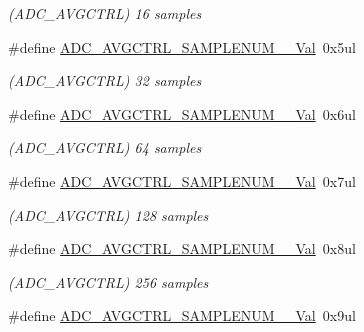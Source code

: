 \begin{DoxyCompactItemize}
\begin{DoxyCompactList}\small\item\em (A\+D\+C\+\_\+\+A\+V\+G\+C\+T\+R\+L) 16 samples \end{DoxyCompactList}\item 
\hypertarget{group___s_a_m_l21___a_d_c_gac9caa4b313c212c56aa881082f2e37c9}{}\#define \hyperlink{group___s_a_m_l21___a_d_c_gac9caa4b313c212c56aa881082f2e37c9}{A\+D\+C\+\_\+\+A\+V\+G\+C\+T\+R\+L\+\_\+\+S\+A\+M\+P\+L\+E\+N\+U\+M\+\_\+\_\+\+Val}~0x5ul\label{group___s_a_m_l21___a_d_c_gac9caa4b313c212c56aa881082f2e37c9}

\begin{DoxyCompactList}\small\item\em (A\+D\+C\+\_\+\+A\+V\+G\+C\+T\+R\+L) 32 samples \end{DoxyCompactList}\item 
\hypertarget{group___s_a_m_l21___a_d_c_gaa681a5f11f5f2c7147f8471caa9a1789}{}\#define \hyperlink{group___s_a_m_l21___a_d_c_gaa681a5f11f5f2c7147f8471caa9a1789}{A\+D\+C\+\_\+\+A\+V\+G\+C\+T\+R\+L\+\_\+\+S\+A\+M\+P\+L\+E\+N\+U\+M\+\_\+\_\+\+Val}~0x6ul\label{group___s_a_m_l21___a_d_c_gaa681a5f11f5f2c7147f8471caa9a1789}

\begin{DoxyCompactList}\small\item\em (A\+D\+C\+\_\+\+A\+V\+G\+C\+T\+R\+L) 64 samples \end{DoxyCompactList}\item 
\hypertarget{group___s_a_m_l21___a_d_c_gafd0a9b19d5e189c78725643a1cd6fd62}{}\#define \hyperlink{group___s_a_m_l21___a_d_c_gafd0a9b19d5e189c78725643a1cd6fd62}{A\+D\+C\+\_\+\+A\+V\+G\+C\+T\+R\+L\+\_\+\+S\+A\+M\+P\+L\+E\+N\+U\+M\+\_\+\_\+\+Val}~0x7ul\label{group___s_a_m_l21___a_d_c_gafd0a9b19d5e189c78725643a1cd6fd62}

\begin{DoxyCompactList}\small\item\em (A\+D\+C\+\_\+\+A\+V\+G\+C\+T\+R\+L) 128 samples \end{DoxyCompactList}\item 
\hypertarget{group___s_a_m_l21___a_d_c_ga7576edd68ace767f66faf2f7a1541565}{}\#define \hyperlink{group___s_a_m_l21___a_d_c_ga7576edd68ace767f66faf2f7a1541565}{A\+D\+C\+\_\+\+A\+V\+G\+C\+T\+R\+L\+\_\+\+S\+A\+M\+P\+L\+E\+N\+U\+M\+\_\+\_\+\+Val}~0x8ul\label{group___s_a_m_l21___a_d_c_ga7576edd68ace767f66faf2f7a1541565}

\begin{DoxyCompactList}\small\item\em (A\+D\+C\+\_\+\+A\+V\+G\+C\+T\+R\+L) 256 samples \end{DoxyCompactList}\item 
\hypertarget{group___s_a_m_l21___a_d_c_ga7ce78bef6c6d6f18e696b10aae7d9dca}{}\#define \hyperlink{group___s_a_m_l21___a_d_c_ga7ce78bef6c6d6f18e696b10aae7d9dca}{A\+D\+C\+\_\+\+A\+V\+G\+C\+T\+R\+L\+\_\+\+S\+A\+M\+P\+L\+E\+N\+U\+M\+\_\+\_\+\+Val}~0x9ul\label{group___s_a_m_l21___a_d_c_ga7ce78bef6c6d6f18e696b10aae7d9dca}


\end{DoxyCompactItemize}
